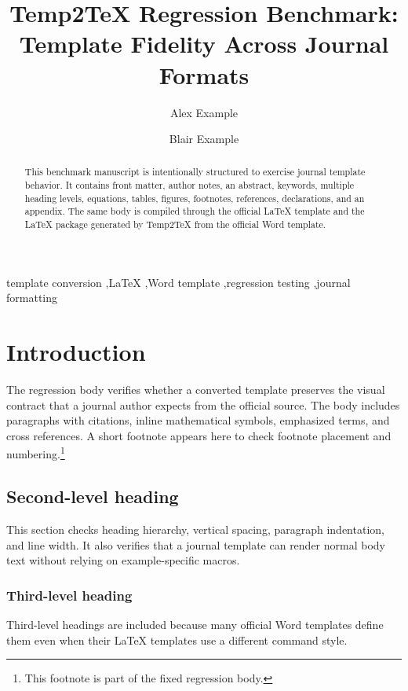 \begin{frontmatter}
\title{Temp2TeX Regression Benchmark: Template Fidelity Across Journal Formats}

\author[inst1]{Alex Example}
\author[inst1]{Blair Example}

\begin{abstract}
This benchmark manuscript is intentionally structured to exercise journal template behavior. It contains front matter, author notes, an abstract, keywords, multiple heading levels, equations, tables, figures, footnotes, references, declarations, and an appendix. The same body is compiled through the official LaTeX template and the LaTeX package generated by Temp2TeX from the official Word template.
\end{abstract}

\begin{keyword}
template conversion \sep LaTeX \sep Word template \sep regression testing \sep journal formatting
\end{keyword}
\end{frontmatter}

\section{Introduction}
The regression body verifies whether a converted template preserves the visual contract that a journal author expects from the official source. The body includes paragraphs with citations, inline mathematical symbols, emphasized terms, and cross references. A short footnote appears here to check footnote placement and numbering.\footnote{This footnote is part of the fixed regression body.}

\subsection{Second-level heading}
This section checks heading hierarchy, vertical spacing, paragraph indentation, and line width. It also verifies that a journal template can render normal body text without relying on example-specific macros.

\subsubsection{Third-level heading}
Third-level headings are included because many official Word templates define them even when their LaTeX templates use a different command style.

